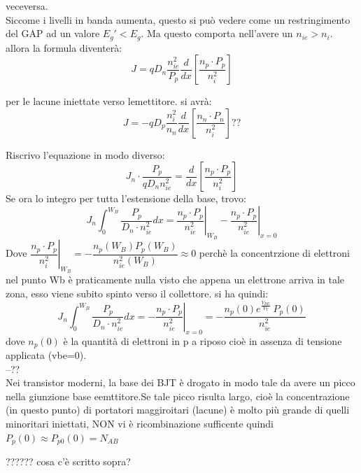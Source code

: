 veceversa.\\
Siccome i livelli in banda aumenta, questo si può vedere come un restringimento del GAP ad un valore $E_g' <E_g$. Ma questo comporta nell'avere un $n_{ie}>n_i$. allora la formula diventerà:
\begin{equation}
    J = q D_n \dfrac{n_{ie}^2}{P_p} \dfrac{d}{dx}\left[ \dfrac{n_p \cdot P_p}{n_i^2}\right]
\end{equation}
\begin{exbox}
    per le lacune iniettate verso lemettitore. si avrà:
%
\begin{equation}
    J = - q D_p \dfrac{n_i^2}{n_n} \dfrac{d}{dx}\left[ \dfrac{n_n \cdot P_n}{n_i^2}\right]??
\end{equation}
\end{exbox}
%
Riscrivo l'equazione in modo diverso:
\begin{equation}
    J_n \cdot \dfrac{P_p}{ q D_nn_{ie}^2} =\dfrac{d}{dx}\left[ \dfrac{n_p \cdot P_p}{n_i^2}\right]
\end{equation}
Se ora lo integro per tutta l'estensione della base, trovo:
%
\begin{equation}
    J_n \int_0^{W_B} \dfrac{P_p}{D_n \cdot n_{ie}^2}dx = \left.\dfrac{n_p \cdot P_p}{n_{ie}^2}\right|_{W_B} -\left. \dfrac{n_p \cdot P_p}{n_{ie}^2}\right|_{x=0}
\end{equation}
Dove $\left.\dfrac{n_p \cdot P_p}{n_i^2}\right|_{W_B}= -\dfrac{n_p(W_B)P_p(W_B)}{n_{ie}^2(W_B)} \approx 0 $ perchè la concentrzione di elettroni nel punto Wb è praticamente nulla visto che appena un elettrone arriva in tale zona, esso viene subito spinto verso il collettore. si ha quindi:
\begin{equation}
   J_n \int_0^{W_B} \dfrac{P_p}{D_n \cdot n_{ie}^2}dx =-\left. \dfrac{n_p \cdot P_p}{n_{ie}^2}\right|_{x=0}= -\dfrac{n_p(0)e^{\frac{V_{BE}}{V_T}}\ P_p(0)}{n_{ie}^2} 
\end{equation}
dove $n_p(0)$ è la quantità di elettroni in p a riposo cioè in assenza di tensione applicata (vbe=0).\\

--??\\

Nei transistor moderni, la base dei BJT è drogato in modo tale da avere un picco nella giunzione base eemttitore.Se tale picco risulta largo, cioè la concentrazione (in questo punto) di portatori maggiroitari (lacune) è molto più grande di quelli minoritari iniettati, NON vi è ricombinazione sufficente quindi $P_p(0)\approx P_{p0}(0)=N_{AB}$
\begin{ricevimento}
    ?????? cosa c'è scritto sopra?
\end{ricevimento}

